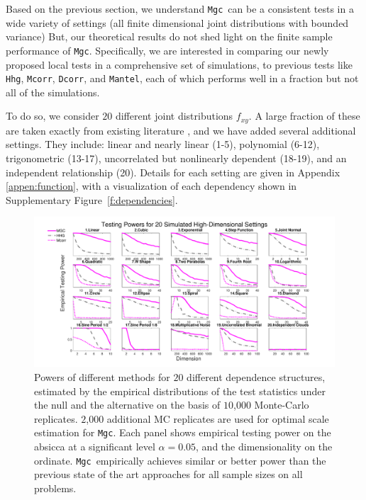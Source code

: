 \documentclass[11pt]{article}
\providecommand{\sct}[1]{{\sc \texttt{#1}}}
\newcommand{\Mgc}{\sct{Mgc}}
\newcommand{\Mgcm}{\sct{Mgc$_M$}}
\newcommand{\Hhg}{\sct{Hhg}}
\newcommand{\Dcorr}{\sct{Dcorr}}
\newcommand{\Mcorr}{\sct{Mcorr}}
\newcommand{\Mantel}{\sct{Mantel}}
\begin{document}
Based on the previous section, we understand \Mgc~can be a consistent tests in a wide variety of settings (all finite dimensional joint distributions with bounded variance)
But, our theoretical results do not shed light on the finite sample performance of \Mgc.
Specifically, we are interested in comparing our newly proposed local tests in a comprehensive set of simulations, to previous tests like \Hhg, \Mcorr, \Dcorr, and \Mantel, each of which performs well in a fraction but not all of the simulations.

To do so, we consider $20$ different joint distributions $f_{xy}$. A large fraction of these are taken exactly from existing literature \cite{SzekelyRizzoBakirov2007, SimonTibshirani2012, GorfineHellerHeller2012, HellerGorfine2013}, and we have added several additional settings.  They include:
linear and nearly linear  (1-5),
polynomial   (6-12),
trigonometric (13-17),
uncorrelated but nonlinearly dependent  (18-19),
and an independent relationship (20).
Details for each setting are given in Appendix \ref{appen:function}, with a visualization of each dependency shown in Supplementary Figure~\ref{f:dependencies}.


\begin{figure}[htbp]
\includegraphics[width=1.0\textwidth]{../Figures/FigHDPower}
\caption{Powers of different methods for $20$ different dependence structures, estimated by the empirical distributions of the test statistics under the null and the alternative on the basis of $10$,$000$ Monte-Carlo replicates. $2$,$000$ additional MC replicates are used for optimal scale estimation for \Mgc.
Each panel shows empirical testing power on the absicca at a significant level $\alpha=0.05$, and the dimensionality on the ordinate.
\Mgc~empirically achieves similar or better power than the previous state of the art approaches for all sample sizes on all problems.
}
\label{f:nD}
\end{figure}
\end{document}
